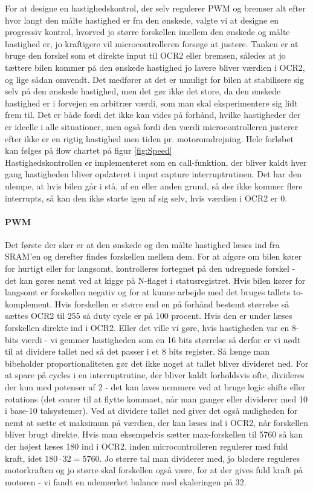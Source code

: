 For at designe en hastighedskontrol, der selv regulerer PWM og bremser alt efter hvor langt den målte hastighed er fra den ønskede, valgte vi at designe en progressiv kontrol, hvorved jo større forskellen imellem den ønskede og målte hastighed er, jo kraftigere vil microcontrolleren forsøge at justere. Tanken er at bruge den forskel som et direkte input til OCR2 eller bremsen, således at jo tættere bilen kommer på den ønskede hastighed jo lavere bliver værdien i OCR2, og lige sådan omvendt. Det medfører at det er umuligt for bilen at stabilisere sig selv på den ønskede hastighed, men det gør ikke det store, da den ønskede hastighed er i forvejen en arbitrær værdi, som man skal eksperimentere sig lidt frem til. Det er både fordi det ikke kan vides på forhånd, hvilke hastigheder der er ideelle i alle situationer, men også fordi den værdi microcontrolleren justerer efter ikke er en rigtig hastighed men tiden pr. motoromdrejning. Hele forløbet kan følges på flow chartet på figur \ref{fig:Speed}\\
Hastighedskontrollen er implementeret som en call-funktion, der bliver kaldt hver gang hastigheden bliver opdateret i input capture interruptrutinen. Det har den ulempe, at hvis bilen går i stå, af en eller anden grund, så der ikke kommer flere interrupts, så kan den ikke starte igen af sig selv, hvis værdien i OCR2 er 0. \\
\paragraph{PWM}
Det første der sker er at den ønskede og den målte hastighed læses ind fra SRAM'en og derefter findes forskellen mellem dem. For at afgøre om bilen kører for hurtigt eller for langsomt, kontrolleres fortegnet på den udregnede forskel - det kan gøres nemt ved at kigge på N-flaget i statusregistret. Hvis bilen kører for langsomt er forskellen negativ og for at kunne arbejde med det bruges tallets to-komplement. Hvis forskellen er større end en på forhånd bestemt størrelse så sættes OCR2 til 255 så duty cycle er på 100 procent. Hvis den er under læses forskellen direkte ind i OCR2. Eller det ville vi gøre, hvis hastigheden var en 8-bits værdi - vi gemmer hastigheden som en 16 bits størrelse så derfor er vi nødt til at dividere tallet ned så det passer i et 8 bits register. Så længe man bibeholder proportionaliteten gør det ikke noget at tallet bliver divideret ned. For at spare på cycles i en interruptrutine, der bliver kaldt forholdsvis ofte, divideres der kun med potenser af 2 - det kan laves nemmere ved at bruge logic shifts eller rotations (det svarer til at flytte kommaet, når man ganger eller dividerer med 10 i base-10 talsystemer). Ved at dividere tallet ned giver det også muligheden for nemt at sætte et maksimum på værdien, der kan læses ind i OCR2, når forskellen bliver brugt direkte. Hvis man eksempelvis sætter max-forskellen til 5760 så kan der højest læses 180 ind i OCR2, inden microcontrolleren regulerer med fuld kraft, idet $180 \cdot 32 = 5760$. Jo større tal man dividerer med, jo blødere reguleres motorkraften og jo større skal forskellen også være, for at der gives fuld kraft på motoren - vi fandt en udemærket balance med skaleringen på 32.\\

